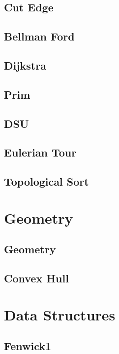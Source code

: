 \documentclass[a4paper,landscape]{article}
\begin{document}
\begin{multicols}{2}
\subsection{Cut Edge}
	
\subsection{Bellman Ford}
	
\subsection{Dijkstra}
	
\subsection{Prim}
	
\subsection{DSU}
	
\subsection{Eulerian Tour}
	
\subsection{Topological Sort}
	

\section{Geometry}
\subsection{Geometry}
	
\subsection{Convex Hull}
    

\section{Data Structures}
\subsection{Fenwick1}
	

\end{multicols}
\end{document}
